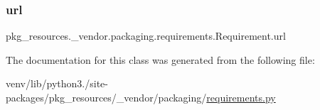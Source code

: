 \subsubsection{\texorpdfstring{url}{url}}
{\footnotesize\ttfamily pkg\+\_\+resources.\+\_\+vendor.\+packaging.\+requirements.\+Requirement.\+url}



The documentation for this class was generated from the following file\+:\begin{DoxyCompactItemize}
\item 
venv/lib/python3./site-\/packages/pkg\+\_\+resources/\+\_\+vendor/packaging/\hyperlink{pkg__resources_2__vendor_2packaging_2requirements_8py}{requirements.\+py}\end{DoxyCompactItemize}
